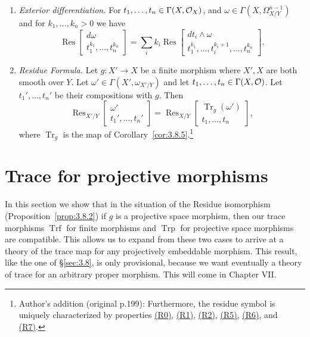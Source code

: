 \begin{enumerate}
\[\]
and conversely if $\operatorname{Res}\bigl[\begin{smallmatrix} fw \\ t_1,\dots,t_n \end{smallmatrix}\bigr]=0$ for all $f\in\Gamma(X,\sO_X)$, then $\omega\in\Gamma\bigl(\sum t_i\,\omega_{X/Y}\bigr)$.
\item[(R9)]\label{res:R9} \emph{Exterior differentiation.} For $t_1,\dots,t_n\in\Gamma(X,\mathcal{O}_X)$, and $\omega\in\Gamma(X,\Omega_{X/Y}^{n-1})$ and for $k_1,\dots,k_n>0$ we have
\[
\operatorname{Res}\begin{bmatrix} d\omega \\ t_1^{k_1},\dots,t_n^{k_n} \end{bmatrix} = \sum_i k_i \operatorname{Res}\begin{bmatrix} dt_i\wedge\omega \\ t_1^{k_1},\dots,t_i^{k_i+1},\dots,t_n^{k_n} \end{bmatrix}.
\]
\item[(R10)]\label{res:R10} \emph{Residue Formula.} Let $g\colon X'\to X$ be a finite morphism where $X',X$ are both smooth over $Y$. Let $\omega'\in\Gamma(X',\omega_{X'/Y})$ and let $t_1,\dots,t_n\in\Gamma(X,\mathcal{O})$. Let $t_1',\dots,t_n'$ be their compositions with $g$. Then
\[
\operatorname{Res}_{X'/Y}\begin{bmatrix} \omega' \\ t_1',\dots,t_n' \end{bmatrix} = \operatorname{Res}_{X/Y}\begin{bmatrix} \operatorname{Tr}_g(\omega') \\ t_1,\dots,t_n \end{bmatrix},
\]
where $\operatorname{Tr}_g$ is the map of Corollary~\ref{cor:3.8.5}.\footnote{Author's addition (original p.199): Furthermore, the residue symbol is uniquely characterized by properties \hyperref[res:R0]{(R0)}, \hyperref[res:R1]{(R1)}, \hyperref[res:R2]{(R2)}, \hyperref[res:R5]{(R5)}, \hyperref[res:R6]{(R6)}, and \hyperref[res:R7]{(R7)}.}
\end{enumerate}



\section{Trace for projective morphisms}\label{sec:3.10}

In this section we show that in the situation of the Residue isomorphism (Proposition~\ref{prop:3.8.2}) if $g$ is a projective space morphism, then our trace morphisms $\operatorname{Trf}$ for finite morphisms and $\operatorname{Trp}$ for projective space morphisms are compatible. This allows us to expand from these two cases to arrive at a theory of the trace map for any projectively embeddable morphism. This result, like the one of \S\ref{sec:3.8}, is only provisional, because we want eventually a theory of trace for an arbitrary proper morphism. This will come in Chapter VII.

